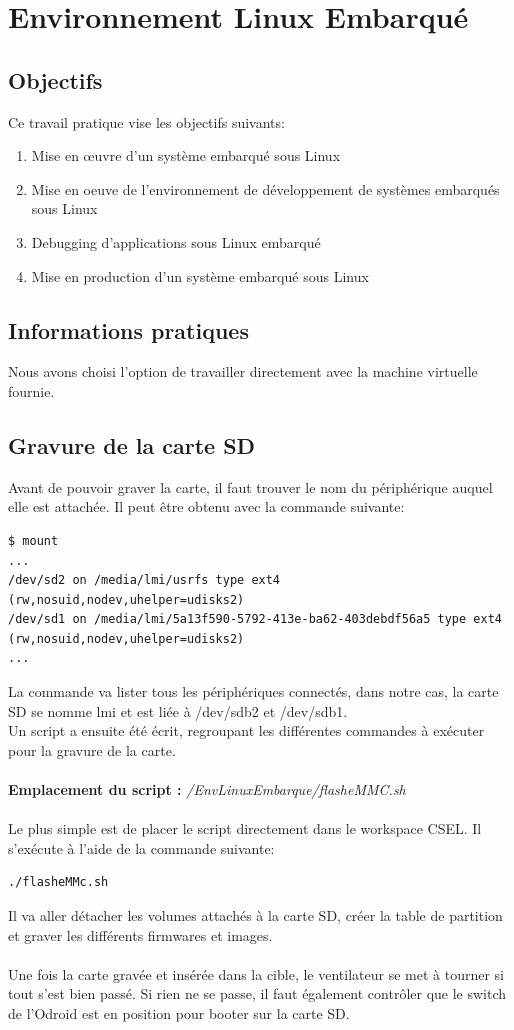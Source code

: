 \section{Environnement Linux Embarqué}
\subsection{Objectifs}
\noindent
Ce travail pratique vise les objectifs suivants:
\begin{enumerate}
	\item Mise en œuvre d'un système embarqué sous Linux
	\item Mise en oeuve de l'environnement de développement de systèmes embarqués sous Linux
	\item Debugging d'applications sous Linux embarqué
	\item Mise en production d'un système embarqué sous Linux
\end{enumerate}
\subsection{Informations pratiques}
Nous avons choisi l'option de travailler directement avec la machine virtuelle fournie.
\subsection{Gravure de la carte SD}
Avant de pouvoir graver la carte, il faut trouver le nom du périphérique auquel elle est attachée. Il peut être obtenu avec la commande suivante:
\begin{lstlisting}
$ mount
...
/dev/sd2 on /media/lmi/usrfs type ext4 (rw,nosuid,nodev,uhelper=udisks2)
/dev/sd1 on /media/lmi/5a13f590-5792-413e-ba62-403debdf56a5 type ext4 (rw,nosuid,nodev,uhelper=udisks2)
...
\end{lstlisting}
La commande va lister tous les périphériques connectés, dans notre cas, la carte SD se nomme lmi et est liée à /dev/sdb2 et /dev/sdb1.\\
Un script a ensuite été écrit, regroupant les différentes commandes à exécuter pour la gravure de la carte.\\\\
\textbf{Emplacement du script : } \textit{/EnvLinuxEmbarque/flasheMMC.sh}\\\\
Le plus simple est de placer le script directement dans le workspace CSEL. Il s'exécute à l'aide de la commande suivante:
\begin{lstlisting}
./flasheMMc.sh
\end{lstlisting}
Il va aller détacher les volumes attachés à la carte SD, créer la table de partition et graver les différents firmwares et images.\\
\\
Une fois la carte gravée et insérée dans la cible, le ventilateur se met à tourner si tout s’est bien passé. Si rien ne se passe, il faut également contrôler que le switch de l’Odroid est en position pour booter sur la carte SD.
